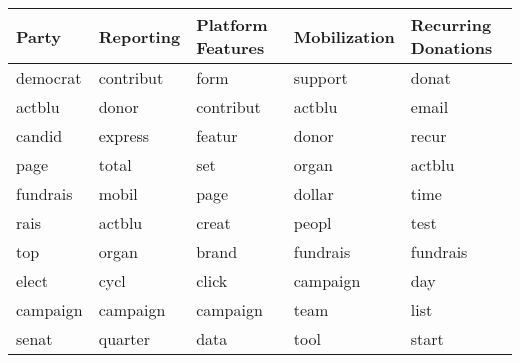 \begin{tabular}{lllll}
  \toprule
Party & Reporting & Platform Features & Mobilization & Recurring Donations \\ 
  \midrule
democrat & contribut & form & support & donat \\ 
  actblu & donor & contribut & actblu & email \\ 
  candid & express & featur & donor & recur \\ 
  page & total & set & organ & actblu \\ 
  fundrais & mobil & page & dollar & time \\ 
  rais & actblu & creat & peopl & test \\ 
  top & organ & brand & fundrais & fundrais \\ 
  elect & cycl & click & campaign & day \\ 
  campaign & campaign & campaign & team & list \\ 
  senat & quarter & data & tool & start \\ 
   \bottomrule
\end{tabular}
